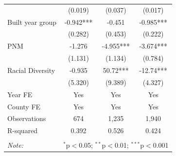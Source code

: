 \documentclass[11pt,twoside,letterpaper]{article}
\begin{document}
\begin{table}[H]
{\begin{tabular}{lccc}
 & (0.019) & (0.037) & (0.017) \\
Built year group & -0.942*** & -0.451 & -0.985*** \\
 & (0.282) & (0.453) & (0.222) \\
PNM & -1.276 & -4.955*** & -3.674*** \\
 & (1.131) & (1.134) & (0.784) \\
Racial Diversity & -0.935 & 50.72*** & -12.74*** \\
 & (5.320) & (9.389) & (4.327) \\ \cline{1-4}
Year FE & Yes & Yes & Yes \\
County FE & Yes & Yes & Yes \\
Observations & 674 & 1,235 & 1,940 \\
R-squared & 0.392 & 0.526 & 0.424 \\ 
\hline
\hline \\[-1.8ex]
\textit{Note:} & \multicolumn{3}{r}{$^{*}$p$<$0.05; $^{**}$p$<$0.01; $^{***}$p$<$0.001} \\
\end{tabular}}
\end{table}
\end{document}
